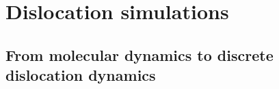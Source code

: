
\chapter{Dislocation simulations}

\ifpdf
    \graphicspath{{Chapter2/Figs/Raster/}{Chapter2/Figs/PDF/}{Chapter2/Figs/}}
\else
    \graphicspath{{Chapter2/Figs/Vector/}{Chapter2/Figs/}}
\fi


\section{From molecular dynamics to discrete dislocation dynamics}

